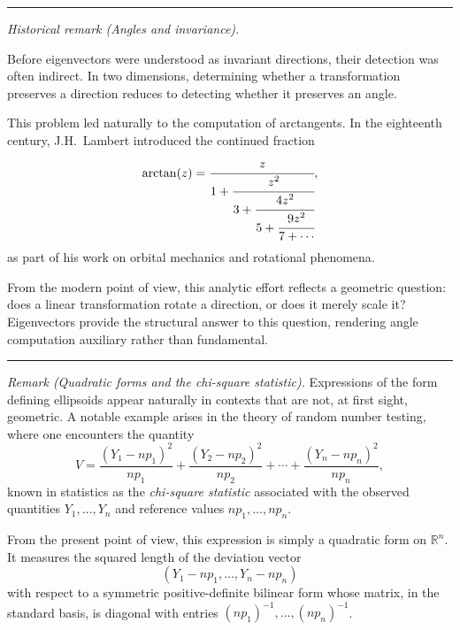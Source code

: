 \bigskip
\hrule
\medskip


\textit{Historical remark (Angles and invariance).}

Before eigenvectors were understood as invariant directions, their detection
was often indirect.
In two dimensions, determining whether a transformation preserves a direction
reduces to detecting whether it preserves an angle.

\medskip

This problem led naturally to the computation of arctangents.
In the eighteenth century, J.H.~Lambert introduced the continued fraction
\[
\arctan(z)
=
\cfrac{z}{1 + \cfrac{z^2}{3 + \cfrac{4z^2}{5 + \cfrac{9z^2}{7 + \cdots}}}},
\]
as part of his work on orbital mechanics and rotational phenomena.

\medskip

From the modern point of view, this analytic effort reflects a geometric
question: does a linear transformation rotate a direction, or does it merely
scale it?
Eigenvectors provide the structural answer to this question, rendering angle
computation auxiliary rather than fundamental.

\medskip
\hrule
\bigskip

\textit{Remark (Quadratic forms and the chi-square statistic).}
Expressions of the form defining ellipsoids appear naturally in contexts that
are not, at first sight, geometric.
A notable example arises in the theory of random number testing, where one
encounters the quantity
\[
V
=
\frac{(Y_1 - np_1)^2}{np_1}
+
\frac{(Y_2 - np_2)^2}{np_2}
+
\cdots
+
\frac{(Y_n - np_n)^2}{np_n},
\]
known in statistics as the \emph{chi-square statistic} associated with the
observed quantities $Y_1,\dots,Y_n$ and reference values $np_1,\dots,np_n$.

\medskip

From the present point of view, this expression is simply a quadratic form on
$\mathbb{R}^n$.
It measures the squared length of the deviation vector
\[
(Y_1 - np_1,\dots,Y_n - np_n)
\]
with respect to a symmetric positive-definite bilinear form whose matrix, in
the standard basis, is diagonal with entries
$(np_1)^{-1},\dots,(np_n)^{-1}$.

